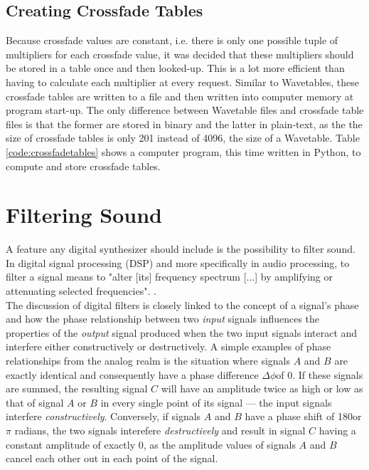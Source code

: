 \documentclass[12pt,twoside]{report}
\begin{document}
\section{Creating Crossfade Tables}

Because crossfade values are constant, i.e. there is only one possible tuple of multipliers for each crossfade value, it was decided that these multipliers should be stored in a table once and then looked-up. This is a lot more efficient than having to calculate each multiplier at every request. Similar to Wavetables, these crossfade tables are written to a file and then written into computer memory at program start-up. The only difference between Wavetable files and crossfade table files is that the former are stored in binary and the latter in plain-text, as the the size of crossfade tables is only 201 instead of 4096, the size of a Wavetable. Table \ref{code:crossfadetables} shows a computer program, this time written in Python, to compute and store crossfade tables.

\begin{table}[hbt!]
  
  \caption{}
  \label{code:crossfadetables}
\end{table}

\chapter{Filtering Sound}

A feature any digital synthesizer should include is the possibility to filter sound. In digital signal processing (DSP) and more specifically in audio processing, to filter a signal means to "alter [its] frequency spectrum [...] by amplifying or attenuating selected frequencies". .\\

\noindent The discussion of digital filters is closely linked to the concept of a signal's phase and how the phase relationship between two \emph{input} signals influences the properties of the \emph{output} signal produced when the two input signals interact and interfere either constructively or destructively. A simple examples of phase relationships from the analog realm is the situation where signals $A$ and $B$ are exactly identical and consequently have a phase difference $\Delta \phi$of $0$. If these signals are summed, the resulting signal $C$ will have an amplitude twice as high or low as that of signal $A$ or $B$ in every single point of its signal --- the input signals interfere \emph{constructively}. Conversely, if signals $A$ and $B$ have a phase shift of 180\degree or $\pi$ radians, the two signals interefere \emph{destructively} and result in signal $C$ having a constant amplitude of exactly $0$, as the amplitude values of signals $A$ and $B$ cancel each other out in each point of the signal.\\
\end{document}
